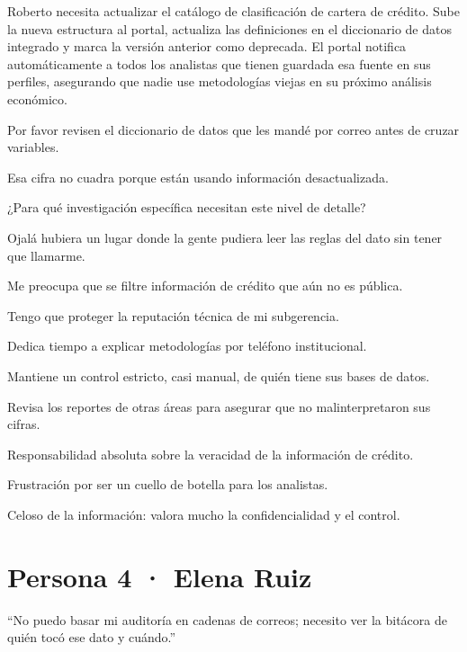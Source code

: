 Roberto necesita actualizar el catálogo de clasificación de cartera de crédito. Sube la nueva
estructura al portal, actualiza las definiciones en el diccionario de datos integrado y marca
la versión anterior como deprecada. El portal notifica automáticamente a todos los analistas
que tienen guardada esa fuente en sus perfiles, asegurando que nadie use metodologías viejas
en su próximo análisis económico.

  {\item Por favor revisen el diccionario de datos que les mandé por correo antes de cruzar
     variables.
   \item Esa cifra no cuadra porque están usando información desactualizada.
   \item ¿Para qué investigación específica necesitan este nivel de detalle?}
  {\item Ojalá hubiera un lugar donde la gente pudiera leer las reglas del dato sin tener que
     llamarme.
   \item Me preocupa que se filtre información de crédito que aún no es pública.
   \item Tengo que proteger la reputación técnica de mi subgerencia.}
  {\item Dedica tiempo a explicar metodologías por teléfono institucional.
   \item Mantiene un control estricto, casi manual, de quién tiene sus bases de datos.
   \item Revisa los reportes de otras áreas para asegurar que no malinterpretaron sus cifras.}
  {\item Responsabilidad absoluta sobre la veracidad de la información de crédito.
   \item Frustración por ser un cuello de botella para los analistas.
   \item Celoso de la información: valora mucho la confidencialidad y el control.}

\clearpage
\section{Persona 4 · Elena Ruiz}

  {“No puedo basar mi auditoría en cadenas de correos; necesito ver la bitácora de quién tocó
   ese dato y cuándo.”}

